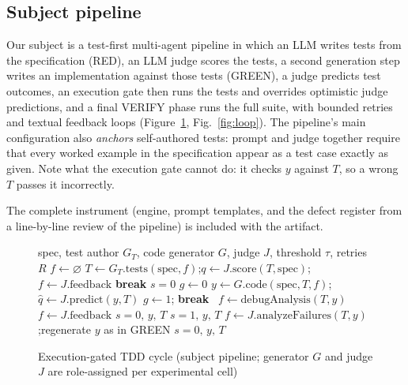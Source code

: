 \subsection{Subject pipeline}

Our subject is a test-first multi-agent pipeline in which an LLM writes tests from the
specification (RED), an LLM judge scores the tests, a second generation step writes an
implementation against those tests (GREEN), a judge predicts test outcomes, an execution
gate then runs the tests and overrides optimistic judge predictions, and a final VERIFY phase
runs the full suite, with bounded retries and textual feedback loops
(Figure~\ref{alg:tdd}, Fig.~\ref{fig:loop}). The pipeline's main configuration also
\emph{anchors} self-authored tests: prompt and judge together require that every worked example
in the specification appear as a test case exactly as given. Note what the execution gate cannot do:
it checks $y$ against $T$, so a wrong $T$ passes it incorrectly.

The complete instrument (engine, prompt templates, and the defect register from a
line-by-line review of the pipeline) is included with the artifact.

\begin{figure}[t]
\caption{Execution-gated TDD cycle (subject pipeline; generator $G$ and judge $J$ are
role-assigned per experimental cell)}
\label{alg:tdd}
\begin{algorithmic}[1]
\Require spec, test author $G_T$, code generator $G$, judge $J$, threshold $\tau$, retries $R$
\State $f \gets \varnothing$
 
  \State $T \gets G_T.\mathrm{tests}(\mathrm{spec}, f)$;\quad $q \gets J.\mathrm{score}(T, \mathrm{spec})$;\quad $f \gets J.\mathrm{feedback}$
   \textbf{break} \EndIf
\EndFor
{} \Return $s{=}0$ \EndIf
\State $g \gets 0$
 
  \State $y \gets G.\mathrm{code}(\mathrm{spec}, T, f)$;\quad $\hat{q} \gets J.\mathrm{predict}(y, T)$
     $g \gets 1$; \textbf{break} 
    \Else\ $f \gets \mathrm{debugAnalysis}(T, y)$ \EndIf
  \Else\ $f \gets J.\mathrm{feedback}$ \EndIf
\EndFor
{} \Return $s{=}0,\,y,\,T$ \EndIf
{} 
   \Return $s{=}1,\, y,\, T$ \EndIf
  \State $f \gets J.\mathrm{analyzeFailures}(T, y)$;\quad regenerate $y$ as in GREEN
\EndFor
\State \Return $s{=}0,\, y,\, T$
\end{algorithmic}
\end{figure}

